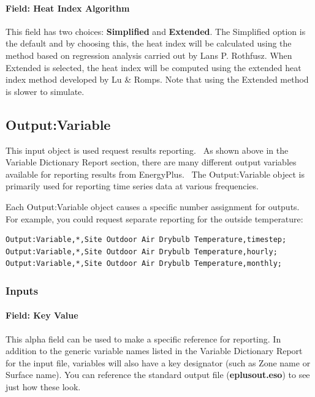 \paragraph{Field: Heat Index Algorithm}\label{Heat-Index-Algorithm}

This field has two choices: \textbf{Simplified} and \textbf{Extended}. The
Simplified option is the default and by choosing this, the heat index will be
calculated using the method based on regression analysis carried out by Lans P.
Rothfusz. When Extended is selected, the heat index will be computed using the
extended heat index method developed by Lu \& Romps. Note that using the
Extended method is slower to simulate.

\subsection{Output:Variable}\label{outputvariable}

This input object is used request results reporting.~ As shown above in the Variable Dictionary Report section, there are many different output variables available for reporting results from EnergyPlus.~ The Output:Variable object is primarily used for reporting time series data at various frequencies.

Each Output:Variable object causes a specific number assignment for outputs. For example, you could request separate reporting for the outside temperature:

\begin{lstlisting}
Output:Variable,*,Site Outdoor Air Drybulb Temperature,timestep;
Output:Variable,*,Site Outdoor Air Drybulb Temperature,hourly;
Output:Variable,*,Site Outdoor Air Drybulb Temperature,monthly;
\end{lstlisting}

\subsubsection{Inputs}\label{inputs-8-019}

\paragraph{Field: Key Value}\label{field-key-value}

This alpha field can be used to make a specific reference for reporting. In addition to the generic variable names listed in the Variable Dictionary Report for the input file, variables will also have a key designator (such as Zone name or Surface name). You can reference the standard output file (\textbf{eplusout.eso}) to see just how these look.

